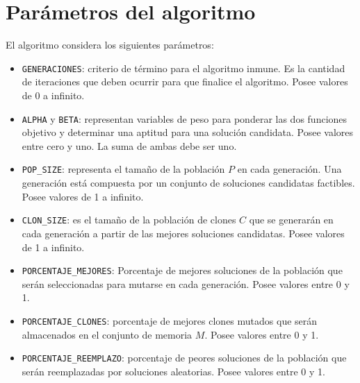 \section{Parámetros del algoritmo}

El algoritmo considera los siguientes parámetros:

\begin{itemize}
\item \texttt{GENERACIONES}: criterio de término para el algoritmo inmune. Es la cantidad de iteraciones que deben ocurrir para que finalice el algoritmo. Posee valores de 0 a infinito.
\item \texttt{ALPHA} y \texttt{BETA}: representan variables de peso para ponderar las dos funciones objetivo y determinar una aptitud para una solución candidata. Posee valores entre cero y uno. La suma de ambas debe ser uno.
\item \texttt{POP\_SIZE}: representa el tamaño de la población $P$ en cada generación. Una generación está compuesta por un conjunto de soluciones candidatas factibles. Posee valores de 1 a infinito.
\item \texttt{CLON\_SIZE}: es el tamaño de la población de clones $C$ que se generarán en cada generación a partir de las mejores soluciones candidatas. Posee valores de 1 a infinito.
\item \texttt{PORCENTAJE\_MEJORES}: Porcentaje de mejores soluciones de la población que serán seleccionadas para mutarse en cada generación. Posee valores entre 0 y 1.
\item \texttt{PORCENTAJE\_CLONES}: porcentaje de mejores clones mutados que serán almacenados en el conjunto de memoria $M$. Posee valores entre 0 y 1.
\item \texttt{PORCENTAJE\_REEMPLAZO}: porcentaje de peores soluciones de la población que serán reemplazadas por soluciones aleatorias. Posee valores entre 0 y 1.
\end{itemize}
